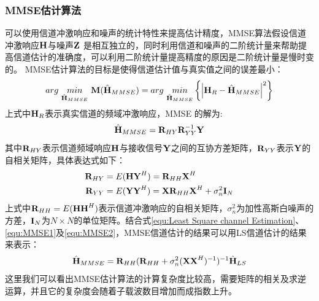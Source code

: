 \subsubsection{MMSE估计算法}
可以使用信道冲激响应和噪声的统计特性来提高估计精度，MMSE算法假设信道冲激响应$\textbf H$与噪声$\textbf Z$ 是相互独立的，同时利用信道和噪声的二阶统计量来帮助提高信道估计的准确度，可以利用二阶统计量提高精度的原因是二阶统计量是慢时变的。
MMSE估计算法的目标是使得信道估计值与真实值之间的误差最小：
\begin{equation}
arg\ \underset {{\hat{\textbf H}_{MMSE}}}{min}\ {\textbf M} ({\hat{\textbf H}_{MMSE}})=arg\ \underset {{\hat{\textbf H}_{MMSE}}}{min}\left \{  {\left |{\textbf H_{R}}- {\hat{\textbf H}_{MMSE}} \right|}^2\right\}
\end{equation}
上式中$\textbf H_R$表示真实信道的频域冲激响应，MMSE 的解为\cite{Kay1993FSS}:
\begin{equation}
\hat{\textbf H}_{MMSE}= \textbf R_{HY}\textbf R_{YY}^{-1}\textbf Y
\label{equ:MMSE1}
\end{equation}
其中$\textbf R_{HY}$表示信道频域响应$\textbf H$与接收信号$\textbf Y$之间的互协方差矩阵，$\textbf R_{YY}$表示$\textbf Y$的自相关矩阵，具体表达式如下：
\begin{equation}
\begin{aligned}
\textbf R_{HY}&=E(\textbf H{\textbf Y}^H)={\textbf R}_{HH}{\textbf X}^H \\
\textbf R_{YY} &= E({\textbf Y}{\textbf Y}^H)={\textbf X}{\textbf R}_{HH}{\textbf X}^H + \sigma_n^2{\textbf I}_N
\end{aligned}
\label{equ:MMSE2}
\end{equation}
上式中$\textbf R_{HH}=E(\textbf H {\textbf H}^H)$表示信道冲激响应的自相关矩阵，$\sigma_n^2$为加性高斯白噪声的方差，$\textbf I_N$为$N\times N$的单位矩阵。结合式\ref{equ:Least Square channel Estimation}、\ref{equ:MMSE1}及\ref{equ:MMSE2}，MMSE信道估计的结果可以用LS信道估计的结果来表示：
\begin{equation}
\hat{\textbf H}_{MMSE}= \textbf R_{HH}(\textbf R_{HH}+\sigma_n^2(\textbf X \textbf X^H)^{-1})^{-1}{\hat{\textbf H}_{LS}}
\label{equ:MMSE3}
\end{equation}
这里我们可以看出MMSE估计算法的计算复杂度比较高，需要矩阵的相关及求逆运算，并且它的复杂度会随着子载波数目增加而成指数上升。
